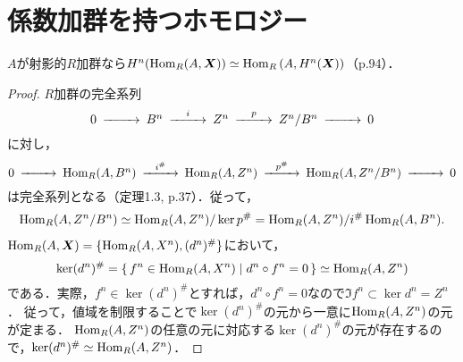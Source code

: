 \section{係数加群を持つホモロジー}
\begin{screen}
  $A$が射影的$R$加群なら$H^n (\operatorname{Hom}_R(A, \boldsymbol{X})) \simeq \operatorname{Hom}_R{}(A, H^n(\boldsymbol{X}))$（p.94）．
\end{screen}
\begin{proof}
  $R$加群の完全系列
  \[
  \begin{CD}
    0 @>>> B^n @>{i}>> Z^n @>{p}>> Z^n/B^n @>>> 0 \\
  \end{CD}
  \]
  に対し，
  \[
  \begin{CD}
    0 @>>> \Hom_R (A, B^n) @>{i^\#}>> \Hom_R (A, Z^n) @>{p^\#}>> \Hom_R (A, Z^n/B^n) @>>> 0
  \end{CD}
  \]
  は完全系列となる（定理1.3, p.37）．従って，
  \begin{align}
    \operatorname{Hom}_R (A, Z^n/B^n) \simeq \operatorname{Hom}_R (A, Z^n) / \ker p^\# = \operatorname{Hom}_R (A, Z^n) / i^\# \operatorname{Hom}_R (A, B^n). \label{HnHom_HomHn_eq1}
  \end{align}
  $\operatorname{Hom}_R (A, \boldsymbol{X}) = \{ \operatorname{Hom}_R (A, X^n), (d^n)^\# \}$において，
  \[ \ker (d^n)^\# = \left\{\, f^n \in \operatorname{Hom}_R (A, X^n) \mid d^n \circ f^n = 0 \,\right\} \simeq \operatorname{Hom}_R (A, Z^n)\]
  である．実際，$f^n \in \ker (d^n)^\#$とすれば，$d^n \circ f^n = 0$なので$\Im f^n \subset \ker d^n = Z^n$．
  従って，値域を制限することで$\ker (d^n)^\#$の元から一意に$\operatorname{Hom}_R (A, Z^n)$の元が定まる．
  $\operatorname{Hom}_R (A, Z^n)$の任意の元に対応する$\ker (d^n)^\#$の元が存在するので，$ \ker (d^n)^\# \simeq \operatorname{Hom}_R (A, Z^n)$．


\end{proof}
